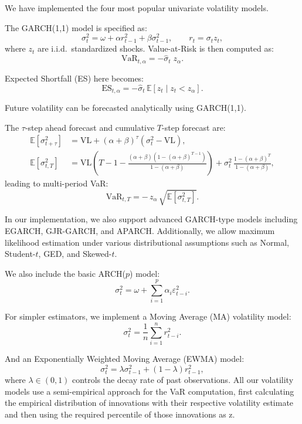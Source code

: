 \documentclass[12pt]{article}
\begin{document}
\vspace{1em}
\underline{}

\vspace{0.6em}

We have implemented the four most popular univariate volatility models.

The GARCH(1,1) model is specified as:
\[
  \sigma_t^2 = \omega + \alpha r_{t-1}^2 + \beta \sigma_{t-1}^2, \qquad r_t = \sigma_t z_t,
\]
where $z_t$ are i.i.d.\ standardized shocks. Value-at-Risk is then computed as:
\[
  \text{VaR}_{t,\alpha} = -\hat{\sigma}_t \; z_\alpha.
\]


Expected Shortfall (ES) here becomes:
\[
  \text{ES}_{t,\alpha} = -\hat{\sigma}_t \,\mathbb{E}[z_t \mid z_t < z_\alpha].
\]

Future volatility can be forecasted analytically using GARCH(1,1). 

The $\tau$-step ahead forecast and cumulative $T$-step forecast are:
\begin{align*}
  \mathbb{E}[\sigma_{t+\tau}^2] &= \mathrm{VL} + (\alpha+\beta)^\tau(\sigma_t^2 - \mathrm{VL}),  \\  
  \mathbb{E}[\sigma_{t,T}^2] &= \mathrm{VL}\left(T-1 - \frac{(\alpha+\beta)(1-(\alpha+\beta)^{T-1})}{1-(\alpha+\beta)}\right)
    + \sigma_t^2\,\frac{1-(\alpha+\beta)^T}{1-(\alpha+\beta)},
\end{align*}
leading to multi-period VaR:
\[
  \text{VaR}_{t,T} = -\,z_\alpha \,\sqrt{\mathbb{E}[\sigma_{t,T}^2]}.
\]

In our implementation, we also support advanced GARCH-type models including EGARCH, GJR-GARCH, and APARCH. Additionally, we allow maximum likelihood estimation under various distributional assumptions such as Normal, Student-$t$, GED, and Skewed-$t$.

We also include the basic ARCH($p$) model:
\[
  \sigma_t^2 = \omega + \sum_{i=1}^p \alpha_i \varepsilon_{t-i}^2.
\]

For simpler estimators, we implement a Moving Average (MA) volatility model:
\[
  \sigma_t^2 = \frac{1}{n} \sum_{i=1}^n r_{t-i}^2.
\]

And an Exponentially Weighted Moving Average (EWMA) model:
\[
  \sigma_t^2 = \lambda \sigma_{t-1}^2 + (1 - \lambda) r_{t-1}^2,
\]
where $\lambda \in (0,1)$ controls the decay rate of past observations.
All our volatility models use a semi-empirical approach for the VaR computation, first calculating the empirical distribution of innovations with their respective volatility estimate and then using the required percentile of those innovations as z.
\end{document}
